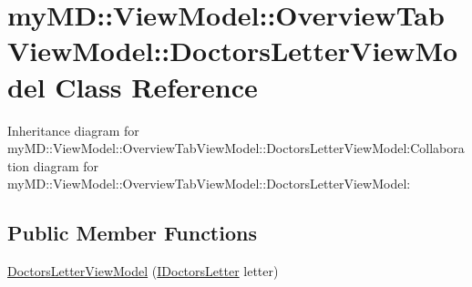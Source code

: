\hypertarget{classmy_m_d_1_1_view_model_1_1_overview_tab_view_model_1_1_doctors_letter_view_model}{
\section{my\-MD::View\-Model::Overview\-Tab\-View\-Model::Doctors\-Letter\-View\-Model Class Reference}
\label{d5/d96/classmy_m_d_1_1_view_model_1_1_overview_tab_view_model_1_1_doctors_letter_view_model}
}
Inheritance diagram for my\-MD::View\-Model::Overview\-Tab\-View\-Model::Doctors\-Letter\-View\-Model:Collaboration diagram for my\-MD::View\-Model::Overview\-Tab\-View\-Model::Doctors\-Letter\-View\-Model:\subsection*{Public Member Functions}
\begin{CompactItemize}
\item 
\hypertarget{classmy_m_d_1_1_view_model_1_1_overview_tab_view_model_1_1_doctors_letter_view_model_35756960fcd9174b542cb85f2e147107}{
\hyperlink{classmy_m_d_1_1_view_model_1_1_overview_tab_view_model_1_1_doctors_letter_view_model_35756960fcd9174b542cb85f2e147107}{Doctors\-Letter\-View\-Model} (\hyperlink{interfacemy_m_d_1_1_model_interface_1_1_data_model_interface_1_1_i_doctors_letter}{IDoctors\-Letter} letter)}
\label{d5/d96/classmy_m_d_1_1_view_model_1_1_overview_tab_view_model_1_1_doctors_letter_view_model_35756960fcd9174b542cb85f2e147107}

\end{CompactItemize}
